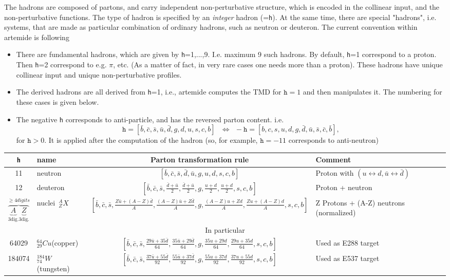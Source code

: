 \documentclass[prd,nofootinbib,eqsecnum,final]{revtex4}
\renewcommand{\(}{\left(}
\renewcommand{\)}{\right)}
\renewcommand{\[}{\left[}
\renewcommand{\]}{\right]}
\begin{document}
The hadrons are composed of partons, and carry independent non-perturbative structure, which is encoded in the collinear input, and the non-perturbative functions. The type of hadron is specified by an \textit{integer} hadron (=\texttt{h}). At the same time, there are special "hadrons", i.e. systems, that are made as particular combination of ordinary hadrons, such as neutron or deuteron. The current convention within artemide is following
\begin{itemize}
\item There are fundamental hadrons, which are given by \texttt{h}=1,...,9. I.e. maximum 9 such hadrons. By default, \texttt{h}=1 correspond to a proton. Then \texttt{h}=2 correspond to e.g. $\pi$, etc. (As a matter of fact, in very rare cases one needs more than a proton). These hadrons have unique collinear input and unique non-perturbative profiles.
\item The derived hadrons are all derived from \texttt{h}=1, i.e., artemide computes the TMD for $\texttt{h}=1$ and then manipulates it. The numbering for these cases is given below.
\item The negative \texttt{h} corresponds to anti-particle, and has the reversed parton content. i.e.
$$
\texttt{h}= [\bar b,\bar c,\bar s,\bar u,\bar d,g,d,u,s,c,b]~~~\Leftrightarrow~~
-\texttt{h}= [b,c,s,u,d,g,\bar d,\bar u,\bar s,\bar c,\bar b],
$$
for $\texttt{h}>0$. It is applied after the computation of the hadron (so, for example, $\texttt{h}=-11$ corresponds to anti-neutron)
\end{itemize}
\begin{center}
\begin{tabular}{||c|l|c|p{4cm}||}
\hline
~~\texttt{h}~~ & name & Parton transformation rule & Comment
\\\hline
11 & neutron & $[\bar b,\bar c,\bar s,\bar d,\bar u,g,u,d,s,c,b]$&
Proton with $(u\leftrightarrow d,\bar u\leftrightarrow \bar d)$
\\\hline
12 & deuteron & $[\bar b,\bar c,\bar s,\frac{\bar d+\bar u}{2},\frac{\bar d+\bar u}{2},g,\frac{u+d}{2},\frac{u+d}{2},s,c,b]$&
Proton + neutron
\\\hline\hline
$\overbrace{\underbrace{A}_{3\text{dig.}}\underbrace{Z}_{3\text{dig.}}}^{\geqslant 4digits}$ & nuclei $\,^A_ZX$ & $[\bar b,\bar c,\bar s,\frac{Z\bar u+(A-Z)\bar d}{A},\frac{(A-Z)\bar u+Z\bar d}{A},g,\frac{(A-Z)u+Z d}{A},\frac{Z u+(A-Z) d}{A},s,c,b]$& Z Protons + (A-Z) neutrons (normalized)
\\\hline
\multicolumn{4}{||c||}{In particular}
\\
\hline 
64029 & $^{64}_{29}Cu$(copper) & $[\bar b,\bar c,\bar s,\frac{29\bar u+35\bar d}{64},\frac{35\bar u+29\bar d}{64},g,\frac{35 u+29 d}{64},\frac{29u+35 d}{64},s,c,b]$
& Used as E288 target
\\
\hline 
184074 & $^{184}_{74}W$(tungsten) & $[\bar b,\bar c,\bar s,\frac{37\bar u+55\bar d}{92},\frac{55\bar u+37\bar d}{92},g,\frac{55 u+37 d}{92},\frac{37u+55 d}{92},s,c,b]$
& Used as E537 target
\\\hline\hline
\end{tabular}
\end{center}
\end{document}
